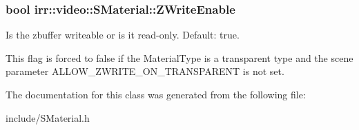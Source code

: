 \subsubsection[{\texorpdfstring{Z\+Write\+Enable}{ZWriteEnable}}]{\setlength{\rightskip}{0pt plus 5cm}bool irr\+::video\+::\+S\+Material\+::\+Z\+Write\+Enable}\hypertarget{classirr_1_1video_1_1SMaterial_a0e6b40e87162a74f2c730af597e20721}{}\label{classirr_1_1video_1_1SMaterial_a0e6b40e87162a74f2c730af597e20721}


Is the zbuffer writeable or is it read-\/only. Default\+: true. 

This flag is forced to false if the Material\+Type is a transparent type and the scene parameter A\+L\+L\+O\+W\+\_\+\+Z\+W\+R\+I\+T\+E\+\_\+\+O\+N\+\_\+\+T\+R\+A\+N\+S\+P\+A\+R\+E\+NT is not set. 

The documentation for this class was generated from the following file\+:\begin{DoxyCompactItemize}
\item 
include/S\+Material.\+h\end{DoxyCompactItemize}
